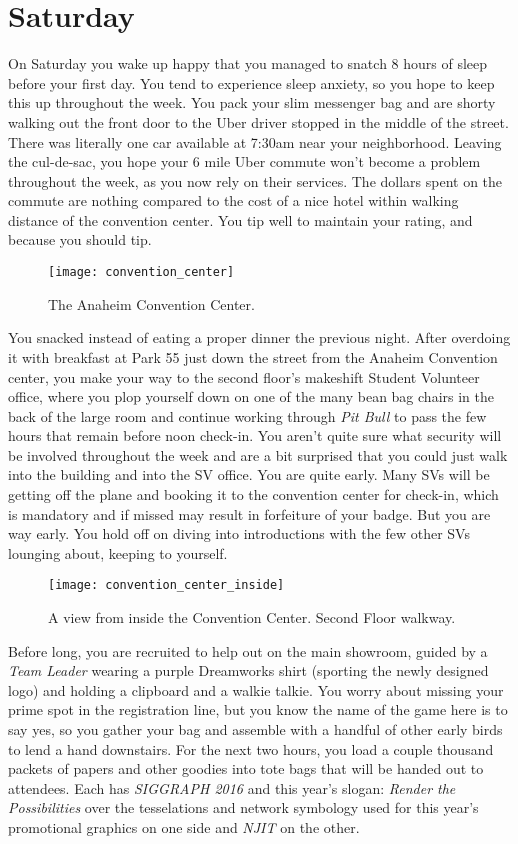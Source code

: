 \documentclass[../main.tex]{subfiles}
\begin{document}
\section{Saturday}

On Saturday you wake up happy that you managed to snatch 8 hours of sleep before your first day. You tend to experience sleep anxiety, so you hope to keep this up throughout the week. You pack your slim messenger bag and are shorty walking out the front door to the Uber driver stopped in the middle of the street. There was literally one car available at 7:30am near your neighborhood. Leaving the cul-de-sac, you hope your 6 mile Uber commute won't become a problem throughout the week, as you now rely on their services. The dollars spent on the commute are nothing compared to the cost of a nice hotel within walking distance of the convention center. You tip well to maintain your rating, and because you should tip.

\begin{figure}[h]
	\centering
	\texttt{[image: convention\_center]}
	\caption*{The Anaheim Convention Center.}
\end{figure}

You snacked instead of eating a proper dinner the previous night. After overdoing it with breakfast at Park 55 just down the street from the Anaheim Convention center, you make your way to the second floor's makeshift Student Volunteer office, where you plop yourself down on one of the many bean bag chairs in the back of the large room and continue working through \textit{Pit Bull} to pass the few hours that remain before noon check-in. You aren't quite sure what security will be involved throughout the week and are a bit surprised that you could just walk into the building and into the SV office. You are quite early. Many SVs will be getting off the plane and booking it to the convention center for check-in, which is mandatory and if missed may result in forfeiture of your badge. But you are way early. You hold off on diving into introductions with the few other SVs lounging about, keeping to yourself.

\begin{figure}[h]
	\centering
	\texttt{[image: convention\_center\_inside]}
	\caption*{A view from inside the Convention Center. Second Floor walkway.}
\end{figure}

Before long, you are recruited to help out on the main showroom, guided by a \textit{Team Leader} wearing a purple Dreamworks shirt (sporting the newly designed logo) and holding a clipboard and a walkie talkie. You worry about missing your prime spot in the registration line, but you know the name of the game here is to say yes, so you gather your bag and assemble with a handful of other early birds to lend a hand downstairs. For the next two hours, you load a couple thousand packets of papers and other goodies into tote bags that will be handed out to attendees. Each has \textit{SIGGRAPH 2016} and this year's slogan: \textit{Render the Possibilities} over the tesselations and network symbology used for this year's promotional graphics on one side and \textit{NJIT} on the other.
\end{document}
